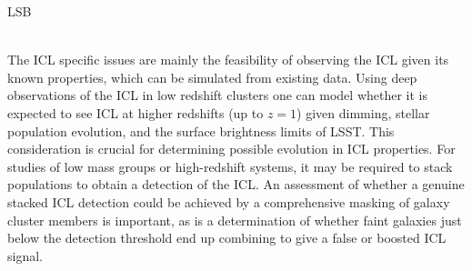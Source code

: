 {\begin{tasklist}{LSB}
\begin{task}
{~\\
The ICL specific issues are mainly the feasibility of observing the ICL given its known properties, which can be simulated from existing data. Using deep observations of the ICL in low redshift clusters one can model whether it is expected to see ICL at higher redshifts (up to $z=1$) given dimming, stellar population evolution, and the surface brightness limits of LSST. This consideration is crucial for determining possible evolution in ICL properties. For
studies of low mass groups or high-redshift systems, it may be required to stack populations to obtain a detection of the ICL.
An assessment of whether a genuine stacked ICL detection could be achieved by a comprehensive masking of galaxy cluster members is important, as is a determination of whether faint galaxies just below the detection threshold end up combining to give a false or boosted ICL signal.
}
~\\
\end{task}
\end{tasklist}
}
